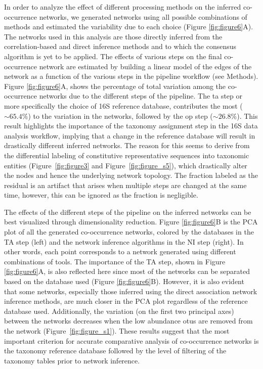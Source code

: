   In order to analyze the effect of different processing methods on the inferred co-occurrence networks, we generated networks using all possible combinations of methods and estimated the variability due to each choice (Figure \ref{fig:figure6}A).
  The networks used in this analysis are those directly inferred from the correlation-based and direct inference methods and to which the consensus algorithm is yet to be applied.
  The effects of various steps on the final co-occurrence network are estimated by building a linear model of the edges of the network as a function of the various steps in the pipeline workflow (see Methods).
  Figure \ref{fig:figure6}A, shows the percentage of total variation among the co-occurrence networks due to the different steps of the pipeline.
  The \ac{ta} step or more specifically the choice of 16S reference database, contributes the most ($\sim65.4\%$) to the variation in the networks, followed by the \ac{op} step ($\sim26.8\%$).
  This result highlights the importance of the taxonomy assignment step in the 16S data analysis workflow, implying that a change in the reference database will result in drastically different inferred networks.
  The reason for this seems to derive from the differential labeling of constitutive representative sequences into taxonomic entities (Figure~\ref{fig:figure3} and Figure~\ref{fig:figure_s5}), which drastically alter the nodes and hence the underlying network topology.
  The fraction labeled as the residual is an artifact that arises when multiple steps are changed at the same time, however, this can be ignored as the fraction is negligible.

  The effects of the different steps of the pipeline on the inferred networks can be best visualized through dimensionality reduction.
  Figure \ref{fig:figure6}B is the PCA plot of all the generated co-occurrence networks, colored by the databases in the TA step (left) and the network inference algorithms in the NI step (right).
  In other words, each point corresponds to a network generated using different combinations of tools.
  The importance of the TA step, shown in Figure \ref{fig:figure6}A, is also reflected here since most of the networks can be separated based on the database used (Figure \ref{fig:figure6}B).
  However, it is also evident that some networks, especially those inferred using the direct association network inference methods, are much closer in the PCA plot regardless of the reference database used.
  Additionally, the variation (on the first two principal axes) between the networks decreases when the low abundance \ac{otu}s are removed from the network (Figure~\ref{fig:figure_s1}).
  These results suggest that the most important criterion for accurate comparative analysis of co-occurrence networks is the taxonomy reference database followed by the level of filtering of the taxonomy tables prior to network inference.

